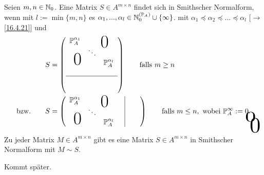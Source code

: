 \documentclass[../../main.tex]{subfiles}
\begin{document}
\begin{df}\label{17.1.2}
Seien $m,n\in \mathbb N_0$. Eine Matrix $S\in A^{m\times n}$ findet sich in Smithscher Normalform, wenn mit $l:=\min\{m,n\}$ es $\alpha_1,...,\alpha_l\in \mathbb N_0^{(\mathbb P_A)}\cup\{\infty\}$. mit $\alpha_1\preceq\alpha_2\preceq...\preceq\alpha_l$ [$\to$\ref{16.4.21}] und 
\begin{align*}
&S=\left(\begin{array}{c c c}
\P_A^{\alpha_1}& \multicolumn{2}{c}{\text{\kern 1em\smash{\raisebox{-1.5ex}{\Huge 0}}}} \\
& \ddots &  \\
\multicolumn{2}{c}{\text{\kern-1.5em\smash{\raisebox{0ex}{\Huge 0}}}} &\P_A^{\alpha_l}\\
& &\\
\hline 
&\tikz[remember picture]\node[inner sep=0pt] (a){ };&\\
& &
\end{array}\right)\qquad\text{falls }m\ge n\\
\text{bzw.}\qquad&S=\left(\begin{array}{c c c c|c c}
 \P_A^{\alpha_1}& \multicolumn{2}{c}{\text{\kern 1em\smash{\raisebox{-1.5ex}{\Huge 0}}}}& &\tikz[remember picture]\node[inner sep=0pt] (b){ }; &\\
& \ddots & & \\
\multicolumn{2}{c}{\text{\kern-1.5em\smash{\raisebox{0ex}{\Huge 0}}}}& \P_A^{\alpha_l}& &\\
\end{array}\right)\qquad\text{falls }m\le n,\text{ wobei } \P_A^\infty:=0. 
\begin{tikzpicture}[overlay, remember picture]
\node at (a.north) [anchor=center,yshift=-0.2cm, yscale=2,xscale=3] {$0$};
\node at (b.east) [anchor=center, xshift=0.2cm,yshift=-0.6cm,  xscale=3, yscale=3] {$0$};
\end{tikzpicture}
\end{align*}
\end{df}

\begin{sat}\label{17.1.3}
Zu jeder Matrix $M\in A^{m\times n}$ gibt es eine Matrix $S\in A^{m\times n}$ in Smithscher Normalform mit $M\sim S$.
\end{sat}
\begin{cproof}
Kommt später.
\end{cproof}
\end{document}
